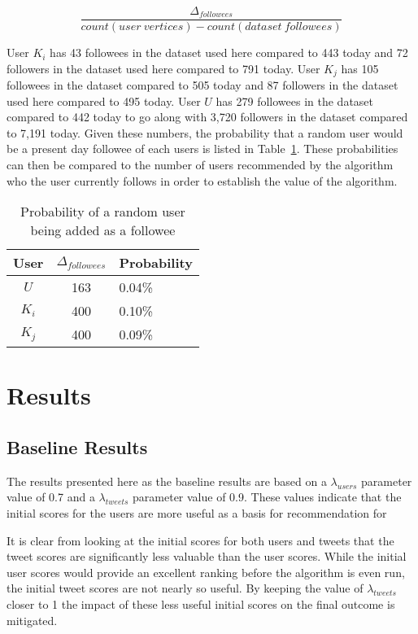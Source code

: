 \begin{center}
\[
\frac{\Delta_{followees} }{count(user\ vertices) - count(dataset\ followees)}
\]
\end{center}


User $K_{i}$ has 43 followees in the dataset used here compared to 443 today and 72 followers in the dataset used here compared to 791 today. User $K_{j}$ has 105 followees in the dataset compared to 505 today and 87 followers in the dataset used here compared to 495 today. User $U$ has 279 followees in the dataset compared to 442 today to go along with 3,720 followers in the dataset compared to 7,191 today. Given these numbers, the probability that a random user would be a present day followee of each users is listed in Table~\ref{tab:RandomUserFolloweeProb}. These probabilities can then be compared to the number of users recommended by the algorithm who the user currently follows in order to establish the value of the algorithm.

\begin{table}
\centering
\begin{tabular}{c|c|l}
{\bf User} & {\bf $\Delta_{followees}$ } & {\bf Probability} \\ \hline
$U$ & 163 &  0.04\%   \\ \hline
$K_{i}$ & 400 & 0.10\% \\ \hline
$K_{j}$ & 400 & 0.09\% \\
\end{tabular}
\caption{Probability of a random user being added as a followee}
\label{tab:RandomUserFolloweeProb}
\end{table}


\section{Results}


\subsection{Baseline Results}
\label{sec:BaselineResults}

The results presented here as the baseline results are based on a $\lambda_{users}$ parameter value of 0.7 and a $\lambda_{tweets}$ parameter value of 0.9. These values indicate that the initial scores for the users are more useful as a basis for recommendation for 

It is clear from looking at the initial scores for both users and tweets that the tweet scores are significantly less valuable than the user scores. While the initial user scores would provide an excellent ranking before the algorithm is even run, the initial tweet scores are not nearly so useful. By keeping the value of $\lambda_{tweets}$ closer to 1 the impact of these less useful initial scores on the final outcome is mitigated.

